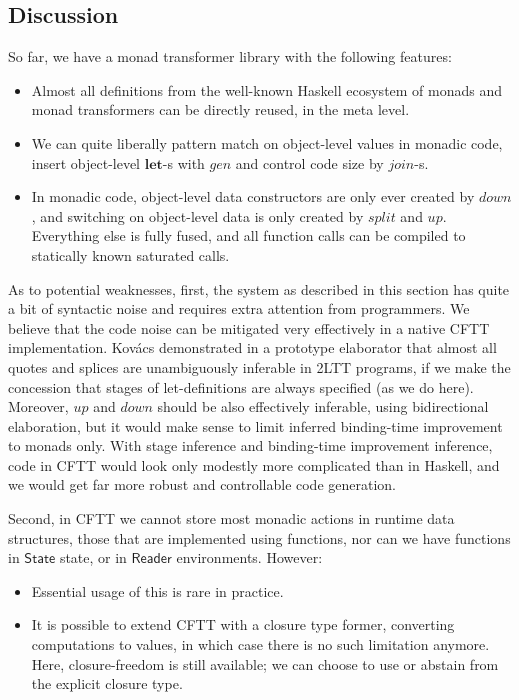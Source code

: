 \documentclass[acmsmall,screen,review,anonymous]{acmart}
\newcommand{\mit}[1]{\mathit{#1}}
\newcommand{\msf}[1]{\mathsf{#1}}
\newcommand{\mbf}[1]{\mathbf{#1}}
\newcommand{\Reader}{\msf{Reader}}
\theoremstyle{remark}
\newcommand{\mup}{\mit{up}}
\newcommand{\mdown}{\mit{down}}
\newcommand{\gen}{\mit{gen}}
\newcommand{\State}{\msf{State}}
\newcommand{\join}{\mit{join}}
\begin{document}

\subsection{Discussion}

So far, we have a monad transformer library with the following features:
\begin{itemize}
\item Almost all definitions from the well-known Haskell ecosystem of monads and monad transformers
      can be directly reused, in the meta level.
\item We can quite liberally pattern match on object-level values in monadic code, insert object-level $\mbf{let}$-s
      with $\gen$ and control code size by $\join$-s.
\item In monadic code, object-level data constructors are only ever created by $\mdown$, and switching on object-level data is only
      created by $\mit{split}$ and $\mup$. Everything else is fully fused, and all function calls can be compiled to
      statically known saturated calls.
\end{itemize}

As to potential weaknesses, first, the system as described in this section has
quite a bit of syntactic noise and requires extra attention from programmers.
We believe that the code noise can be mitigated very effectively in a native
CFTT implementation. Kovács \cite{TODO} demonstrated in a prototype elaborator
that almost all quotes and splices are unambiguously inferable in 2LTT programs,
if we make the concession that stages of let-definitions are always specified
(as we do here). Moreover, $\mup$ and $\mdown$ should be also effectively
inferable, using bidirectional elaboration, but it would make sense to limit
inferred binding-time improvement to monads only. With stage inference and
binding-time improvement inference, code in CFTT would look only modestly more
complicated than in Haskell, and we would get far more robust and controllable
code generation.

Second, in CFTT we cannot store most monadic actions in runtime data structures,
those that are implemented using functions, nor can we have functions in
$\State$ state, or in $\Reader$ environments. However:
\begin{itemize}
  \item Essential usage of this is rare in practice.
  \item It is possible to extend CFTT with a closure type former, converting computations to values,
        in which case there is no such limitation anymore. Here, closure-freedom is still available;
        we can choose to use or abstain from the explicit closure type.
\end{itemize}
\end{document}
